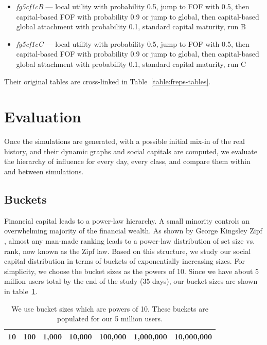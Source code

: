 \documentclass[10pt,oneside]{memoir}
\begin{document}
\begin{itemize}
\item {\itshape fg5cf1cB} --- local utility with probability 0.5, jump to FOF with 0.5, then capital-based FOF with probability 0.9 or jump to global, then capital-based global attachment with probability 0.1, standard capital maturity, run B

\item {\itshape fg5cf1cC} --- local utility with probability 0.5, jump to FOF with 0.5, then capital-based FOF with probability 0.9 or jump to global, then capital-based global attachment with probability 0.1, standard capital maturity, run C
\end{itemize}

Their original tables are cross-linked in Table~\ref{table:freps-tables}.




\pagebreak \section{Evaluation}
\label{evaluation}

Once the simulations are generated, with a possible initial mix-in of the real history, and their dynamic graphs and social capitals are computed, we evaluate the hierarchy of influence for every day, every class, and compare them within and between simulations.


\subsection{Buckets}
\label{buckets}

Financial capital leads to a power-law hierarchy.  A small minority controls an overwhelming majority of the financial wealth.  As shown by George Kingsley Zipf \cite{zipf1949humanbehavior}, almost any man-made ranking leads to a power-law distribution of set size vs. rank, now known as the Zipf law.  Based on this structure, we study our social capital distribution in terms of buckets of exponentially increasing sizes.
For simplicity, we choose the bucket sizes as the powers of 10.  Since we have about 5 million users total by the end of the study (35 days), our bucket sizes are shown in table~\ref{table:bucket-sizes}.

\begin{table}
\begin{tabular}{|ccccccc|}
\toprule
10 & 100 & 1,000 & 10,000 & 100,000 & 1,000,000 & 10,000,000 \\
\bottomrule
\end{tabular}
\label{table:bucket-sizes}
\caption{We use bucket sizes which are powers of 10.  These buckets are populated for our 5 million users.}
\end{table}
\end{document}
